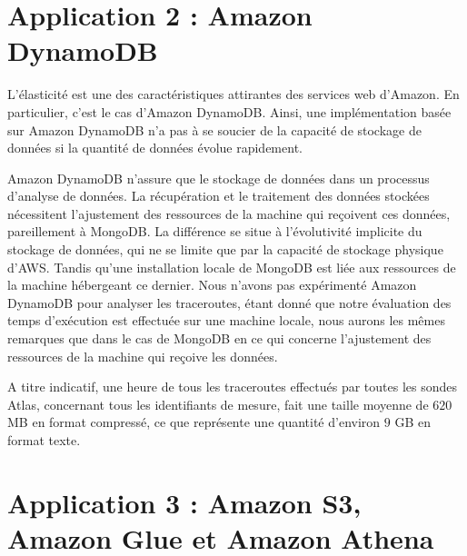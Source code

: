 \section{Application 2 : Amazon DynamoDB}




L'élasticité est une des caractéristiques attirantes des services web d'Amazon. En particulier, c'est le cas d'Amazon DynamoDB. Ainsi, une implémentation basée sur Amazon DynamoDB  n'a pas à se soucier de la capacité  de stockage de données si la quantité de données évolue rapidement. 

 Amazon DynamoDB  n'assure que le stockage de données dans un processus d'analyse de données. La récupération et le traitement  des données stockées nécessitent l'ajustement des ressources de la machine qui reçoivent ces données, pareillement à MongoDB. La différence se situe à l'évolutivité implicite du stockage de données, qui ne se limite que par la capacité de stockage physique d'AWS. Tandis qu'une installation locale de MongoDB est liée aux ressources de la machine hébergeant ce dernier.  Nous n'avons pas expérimenté Amazon DynamoDB pour analyser les traceroutes, étant donné que notre évaluation des temps d'exécution est effectuée sur une machine locale, nous aurons les mêmes remarques que dans le cas de MongoDB en ce qui concerne l'ajustement des ressources de la machine qui reçoive les données.  
 
 A titre indicatif, une heure de tous les traceroutes effectués par toutes les sondes Atlas, concernant tous les identifiants de mesure,  fait une taille moyenne de  $620$ MB en format compressé, ce que représente une quantité d'environ $9$ GB en format texte.

\section{Application 3 : Amazon S3, Amazon Glue  et Amazon Athena }

